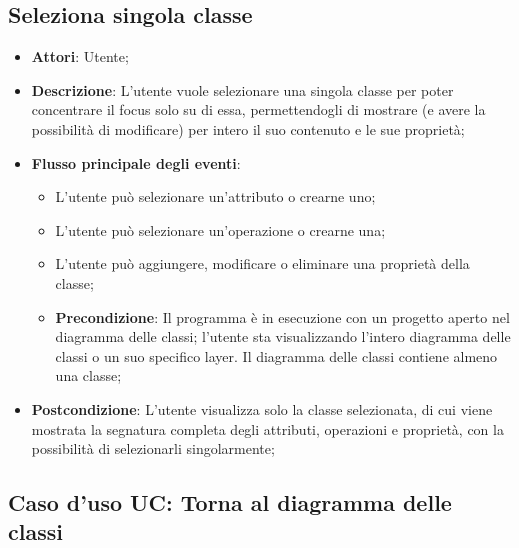 \documentclass[../AnalisiDeiRequisiti.tex]{subfiles}
\begin{document}
				
	\subsection{Seleziona singola classe}
	\begin{itemize}
			\item \textbf{Attori}: Utente;
			\item \textbf{Descrizione}: L'utente vuole selezionare una singola classe per poter concentrare il focus solo su di essa, permettendogli di mostrare (e avere la possibilità di modificare) per intero il suo contenuto e le sue proprietà;
			\item \textbf{Flusso principale degli eventi}: 
		\begin{itemize}
			\item L'utente può selezionare un'attributo o crearne uno;
			\item L'utente può selezionare un'operazione o crearne una;
			\item L'utente può aggiungere, modificare o eliminare una proprietà della classe;
			\item \textbf{Precondizione}: Il programma è in esecuzione con un progetto aperto nel diagramma delle classi; l'utente sta visualizzando l'intero diagramma delle classi o un suo specifico layer. Il diagramma delle classi contiene almeno una classe;
		\end{itemize}
			\item \textbf{Postcondizione}: L'utente visualizza solo la classe selezionata, di cui viene mostrata la segnatura completa degli attributi, operazioni e proprietà, con la possibilità di selezionarli singolarmente;
	\end{itemize}
				
	\subsection{Caso d'uso UC: Torna al diagramma delle classi}			
				
\end{document}
